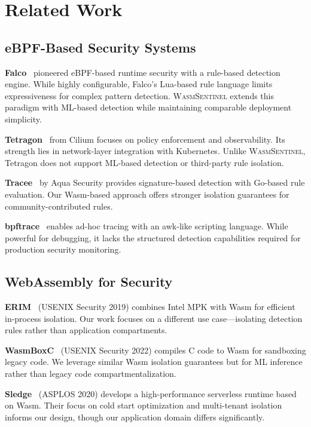 
\section{Related Work}
\label{sec:related-work}

\subsection{eBPF-Based Security Systems}

\textbf{Falco}~\cite{falco} pioneered eBPF-based runtime security with a rule-based detection engine.
While highly configurable, Falco's Lua-based rule language limits expressiveness for complex pattern detection.
\textsc{WasmSentinel} extends this paradigm with ML-based detection while maintaining comparable deployment simplicity.

\textbf{Tetragon}~\cite{tetragon} from Cilium focuses on policy enforcement and observability.
Its strength lies in network-layer integration with Kubernetes.
Unlike \textsc{WasmSentinel}, Tetragon does not support ML-based detection or third-party rule isolation.

\textbf{Tracee}~\cite{tracee} by Aqua Security provides signature-based detection with Go-based rule evaluation.
Our Wasm-based approach offers stronger isolation guarantees for community-contributed rules.

\textbf{bpftrace}~\cite{bpftrace} enables ad-hoc tracing with an awk-like scripting language.
While powerful for debugging, it lacks the structured detection capabilities required for production security monitoring.

\subsection{WebAssembly for Security}

\textbf{ERIM}~\cite{erim} (USENIX Security 2019) combines Intel MPK with Wasm for efficient in-process isolation.
Our work focuses on a different use case---isolating detection rules rather than application compartments.

\textbf{WasmBoxC}~\cite{wasmboxc} (USENIX Security 2022) compiles C code to Wasm for sandboxing legacy code.
We leverage similar Wasm isolation guarantees but for ML inference rather than legacy code compartmentalization.

\textbf{Sledge}~\cite{sledge} (ASPLOS 2020) develops a high-performance serverless runtime based on Wasm.
Their focus on cold start optimization and multi-tenant isolation informs our design, though our application domain differs significantly.


